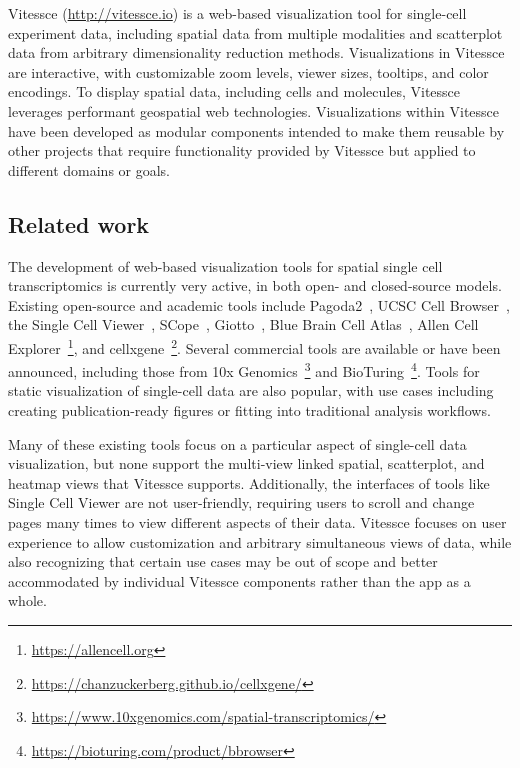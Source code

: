 \documentclass[12pt, letterpaper]{article}
\begin{document}
Vitessce (\url{http://vitessce.io}) is a web-based visualization tool for single-cell experiment data, including spatial data from multiple modalities and scatterplot data from arbitrary dimensionality reduction methods.
Visualizations in Vitessce are interactive, with customizable zoom levels, viewer sizes, tooltips, and color encodings.
To display spatial data, including cells and molecules, Vitessce leverages performant geospatial web technologies.
Visualizations within Vitessce have been developed as modular components intended to make them reusable by other projects that require functionality provided by Vitessce but applied to different domains or goals.

\subsection{Related work}
The development of web-based visualization tools for spatial single cell transcriptomics is currently very active, in both open- and closed-source models.
Existing open-source and academic tools include Pagoda2~\cite{lake2018integrative}, UCSC Cell Browser~\cite{nowakowski2017spatiotemporal}, the Single Cell Viewer~\cite{wang2019single}, SCope~\cite{wouters2019single}, Giotto~\cite{dries2019giotto}, Blue Brain Cell Atlas~\cite{ero2019cell}, Allen Cell Explorer~\footnote{\url{https://allencell.org}}, and cellxgene~\footnote{\url{https://chanzuckerberg.github.io/cellxgene/}}.
Several commercial tools are available or have been announced, including those from 10x Genomics~\footnote{\url{https://www.10xgenomics.com/spatial-transcriptomics/}} and BioTuring~\footnote{\url{https://bioturing.com/product/bbrowser}}.
Tools for static visualization of single-cell data are also popular, with use cases including creating publication-ready figures or fitting into traditional analysis workflows.

Many of these existing tools focus on a particular aspect of single-cell data visualization, but none support the multi-view linked spatial, scatterplot, and heatmap views that Vitessce supports.
Additionally, the interfaces of tools like Single Cell Viewer are not user-friendly, requiring users to scroll and change pages many times to view different aspects of their data.
Vitessce focuses on user experience to allow customization and arbitrary simultaneous views of data, while also recognizing that certain use cases may be out of scope and better accommodated by individual Vitessce components rather than the app as a whole.
\end{document}
